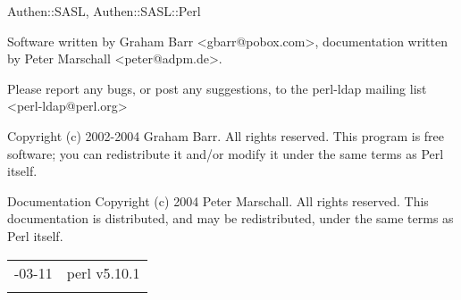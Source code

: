 \documentclass[]{article}
\begin{document}

Authen::SASL, Authen::SASL::Perl


Software written by Graham Barr
\textless{}gbarr@pobox.com\textgreater{}, documentation written by Peter
Marschall \textless{}peter@adpm.de\textgreater{}.

Please report any bugs, or post any suggestions, to the perl-ldap
mailing list \textless{}perl-ldap@perl.org\textgreater{}


Copyright (c) 2002-2004 Graham Barr. All rights reserved. This program
is free software; you can redistribute it and/or modify it under the
same terms as Perl itself.

Documentation Copyright (c) 2004 Peter Marschall. All rights reserved.
This documentation is distributed, and may be redistributed, under the
same terms as Perl itself.

\begin{longtable}[c]{@{}ll@{}}
\toprule\addlinespace
2010-03-11 & perl v5.10.1
\\\addlinespace
\bottomrule
\end{longtable}
\end{document}
